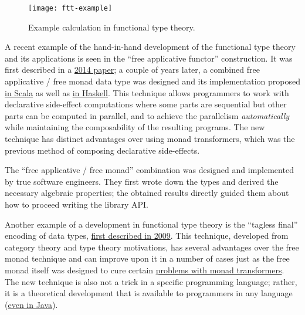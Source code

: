 \begin{figure}
\begin{centering}
\texttt{[image: ftt-example]}
\par\end{centering}
\caption{Example calculation in functional type theory.}
\label{ftt-example}
\end{figure}

A recent example of the hand-in-hand development of the functional
type theory and its applications is seen in the ``free applicative
functor'' construction. It was first described in a \href{https://arxiv.org/pdf/1403.0749.pdf}{2014 paper};
a couple of years later, a combined free applicative / free monad
data type was designed and its implementation proposed \href{https://github.com/typelevel/cats/issues/983}{in Scala}
as well as \href{https://elvishjerricco.github.io/2016/04/08/applicative-effects-in-free-monads.html}{in Haskell}.
This technique allows programmers to work with declarative side-effect
computations where some parts are sequential but other parts can be
computed in parallel, and to achieve the parallelism \emph{automatically}
while maintaining the composability of the resulting programs. The
new technique has distinct advantages over using monad transformers,
which was the previous method of composing declarative side-effects.

The ``free applicative / free monad'' combination was designed and
implemented by true software engineers. They first wrote down the
types and derived the necessary algebraic properties; the obtained
results directly guided them about how to proceed writing the library
API.

Another example of a development in functional type theory is the
 ``tagless final'' encoding of data types, \href{http://okmij.org/ftp/tagless-final/index.html}{first described in 2009}.
This technique, developed from category theory and type theory motivations,
has several advantages over the free monad technique and can improve
upon it in a number of cases \textendash{} just as the free monad
itself was designed to cure certain \href{http://blog.ezyang.com/2013/09/if-youre-using-lift-youre-doing-it-wrong-probably/}{problems with monad transformers}.
The new technique is also not a trick in a specific programming language;
rather, it is a theoretical development that is available to programmers
in any language (\href{https://oleksandrmanzyuk.wordpress.com/2014/06/18/from-object-algebras-to-finally-tagless-interpreters-2/}{even in Java}).

